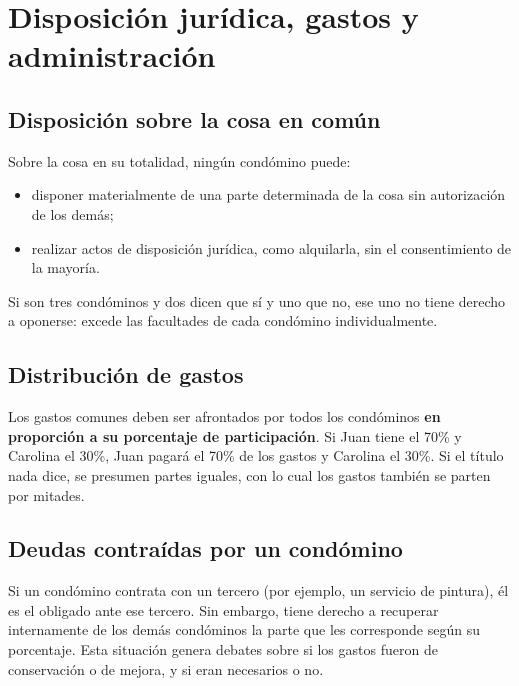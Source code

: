 \documentclass[12pt,oneside]{book}
\begin{document}
\chapter[Disposición, gastos y administración]{Disposición jurídica, gastos y administración}

\section{Disposición sobre la cosa en común}

Sobre la cosa en su totalidad, ningún condómino puede:

\begin{itemize}
    \item disponer materialmente de una parte determinada de la cosa sin autorización de los demás;
    \item realizar actos de disposición jurídica, como alquilarla, sin el consentimiento de la mayoría.
\end{itemize}

Si son tres condóminos y dos dicen que sí y uno que no, ese uno no tiene derecho a oponerse: excede las facultades de cada condómino individualmente.


\section{Distribución de gastos}

Los gastos comunes deben ser afrontados por todos los condóminos \textbf{en proporción a su porcentaje de participación}. Si Juan tiene el 70\% y Carolina el 30\%, Juan pagará el 70\% de los gastos y Carolina el 30\%. Si el título nada dice, se presumen partes iguales, con lo cual los gastos también se parten por mitades.

\section{Deudas contraídas por un condómino}

Si un condómino contrata con un tercero (por ejemplo, un servicio de pintura), él es el obligado ante ese tercero. Sin embargo, tiene derecho a recuperar internamente de los demás condóminos la parte que les corresponde según su porcentaje. Esta situación genera debates sobre si los gastos fueron de conservación o de mejora, y si eran necesarios o no.
\end{document}

